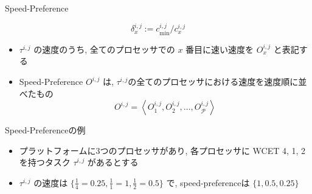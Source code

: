 \begin{frame}{Speed-Preference}
    \begin{definition}
        \begin{equation*}
            \delta_x^{i, j}:=c_{\min }^{i, j} / c_x^{i, j}
        \end{equation*}
    \end{definition}
    \begin{definition}
        \setlength{\linewidth}{0.98\columnwidth}
        \begin{itemize}
            \item $\tau^{i,j}$ の速度のうち, 全てのプロセッサでの $x$ 番目に速い速度を $O_x^{i,j}$ と表記する
            \item Speed-Preference $O^{i, j}$ は, $\tau^{i,j}$の全てのプロセッサにおける速度を速度順に並べたもの
                  \begin{equation*}
                      O^{i, j}=\left\langle O_1^{i, j}, O_2^{i, j}, \ldots, O_{\mathcal{P}}^{i, j}\right\rangle
                  \end{equation*}
        \end{itemize}
    \end{definition}
\end{frame}

\begin{frame}{Speed-Preferenceの例}
    \begin{itemize}
        \item プラットフォームに3つのプロセッサがあり, 各プロセッサに WCET {4, 1, 2} を持つタスク $\tau^{i,j}$ があるとする
        \item $\tau^{i,j}$ の速度は $\{\frac{1}{4}=0.25, \frac{1}{1}=1, \frac{1}{2}=0.5\}$ で, speed-preferenceは $\{1, 0.5, 0.25\}$
    \end{itemize}
\end{frame}
